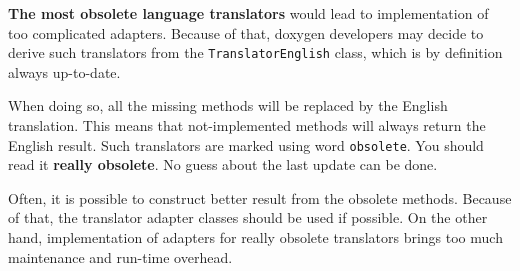 {\bf The most obsolete language translators} would lead to implementation of too complicated adapters. Because of that, doxygen developers may decide to derive such translators from the {\tt TranslatorEnglish} class, which is by definition always up-to-date.

When doing so, all the missing methods will be replaced by the English translation. This means that not-implemented methods will always return the English result. Such translators are marked using word {\tt obsolete}. You should read it {\bf really obsolete}. No guess about the last update can be done.

Often, it is possible to construct better result from the obsolete methods. Because of that, the translator adapter classes should be used if possible. On the other hand, implementation of adapters for really obsolete translators brings too much maintenance and run-time overhead. 
